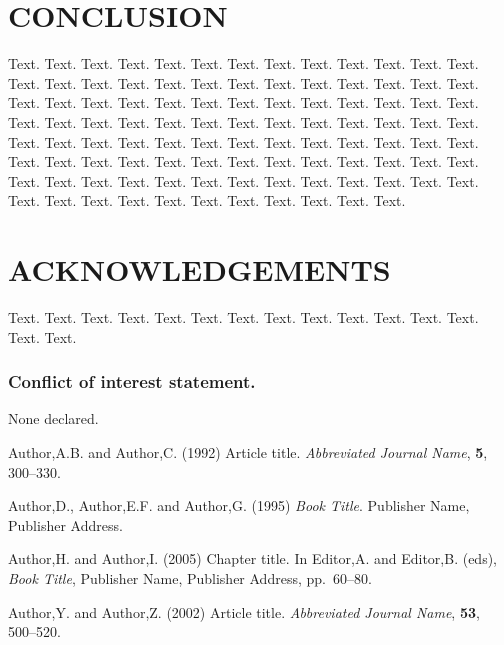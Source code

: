 \documentclass[a4,center,fleqn]{NAR}
\begin{document}
\section{CONCLUSION}

Text. Text. Text. Text. Text. Text. Text. Text. Text. Text. Text.
Text. Text. Text. Text. Text. Text. Text. Text. Text. Text. Text.
Text. Text. Text. Text. Text. Text. Text. Text. Text. Text. Text.
Text. Text. Text. Text. Text. Text. Text. Text. Text. Text. Text.
Text. Text. Text. Text. Text. Text. Text. Text. Text. Text. Text.
Text. Text. Text. Text. Text. Text. Text. Text. Text. Text. Text.
Text. Text. Text. Text. Text. Text. Text. Text. Text. Text. Text.
Text. Text. Text. Text. Text. Text. Text. Text. Text. Text. Text.
Text. Text. Text. Text. Text. Text. Text. Text. Text. Text. Text.
Text. Text. Text.


\section{ACKNOWLEDGEMENTS}

Text. Text. Text. Text. Text. Text. Text. Text. Text. Text. Text.
Text. Text. Text. Text.


\subsubsection{Conflict of interest statement.} None declared.
\newpage


\begin{thebibliography}{4}

Author,A.B. and Author,C. (1992)
Article title.
\textit{Abbreviated Journal Name}, \textbf{5}, 300--330.

Author,D., Author,E.F. and Author,G. (1995)
\textit{Book Title}.
Publisher Name, Publisher Address.

Author,H. and Author,I. (2005)
Chapter title.
In
Editor,A. and Editor,B. (eds),
\textit{Book Title},
Publisher Name, Publisher Address,
pp.\ 60--80.

Author,Y. and Author,Z. (2002)
Article title.
\textit{Abbreviated Journal Name}, \textbf{53}, 500--520.

\end{thebibliography}
\end{document}
